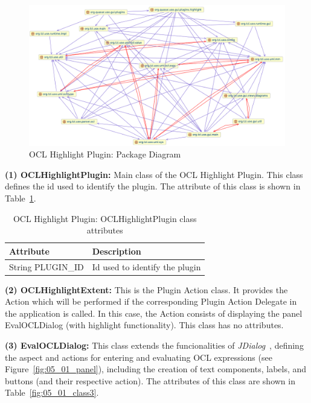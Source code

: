 \begin{figure}[ht]
    \centering
    \includegraphics[width=1\textwidth]{Chapters/figures/5_Implementation/01_PackageDiagram}
    \caption{OCL Highlight Plugin: Package Diagram}
    \label{fig:05_01_packagediagram}
\end{figure}

\textbf{(1) OCLHighlightPlugin:} Main class of the OCL Highlight Plugin. This class defines the id used to identify the plugin. The attribute of this class is shown in Table~\ref{fig:05_01_class1}.

\begin{table}[ht]
\centering
\begin{tabular}{@{}ll@{}}
\toprule
\textbf{Attribute} & \textbf{Description}           \\ \midrule
String PLUGIN\_ID         & Id used to identify the plugin \\ \bottomrule
\end{tabular}
\caption{OCL Highlight Plugin: OCLHighlightPlugin class attributes}
\label{fig:05_01_class1}
\end{table}

\textbf{(2) OCLHighlightExtent:} This is the Plugin Action class. It provides the Action which will be performed if the corresponding Plugin Action Delegate in the application is called. In this case, the Action consists of displaying the panel EvalOCLDialog (with highlight functionality). This class has no attributes.

\textbf{(3) EvalOCLDialog:} This class extends the funcionalities of \textit{JDialog}~\cite{javaxswing}, defining the aspect and actions for entering and evaluating OCL expressions (see Figure~\ref{fig:05_01_panel}), including the creation of text components, labels, and buttons (and their respective action). The attributes of this class are shown in Table~\ref{fig:05_01_class3}. 

